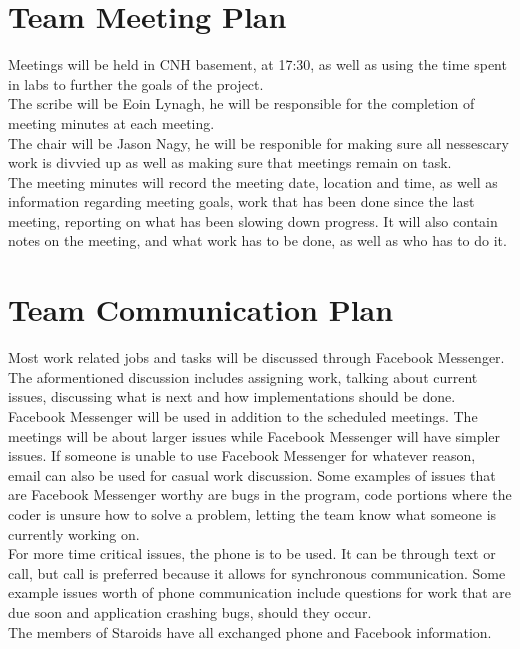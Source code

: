 \documentclass{article}
\begin{document}
\section{Team Meeting Plan}
Meetings will be held in CNH basement, at 17:30, as well as using the time spent in labs to further the goals of the project.\\
The scribe will be Eoin Lynagh, he will be responsible for the completion of meeting minutes at each meeting.\\
The chair will be Jason Nagy, he will be responible for making sure all nessescary work is divvied up as well as making sure that meetings remain on task.\\
The meeting minutes will record the meeting date, location and time, as well as information regarding meeting goals, work that has been done since the last meeting, reporting on what has been slowing down progress. It will also contain notes on the meeting, and what work has to be done, as well as who has to do it.\\

\section{Team Communication Plan}
Most work related jobs and tasks will be discussed through Facebook Messenger. The aformentioned discussion includes assigning work, talking about current issues, discussing what is next and how implementations should be done. Facebook Messenger will be used in addition to the scheduled meetings. The meetings will be about larger issues while Facebook Messenger will have simpler issues. If someone is unable to use Facebook Messenger for whatever reason, email can also be used for casual work discussion. Some examples of issues that are Facebook Messenger worthy are bugs in the program, code portions where the coder is unsure how to solve a problem, letting the team know what someone is currently working on.\\
For more time critical issues, the phone is to be used. It can be through text or call, but call is preferred because it allows for synchronous communication. Some example issues worth of phone communication include questions for work that are due soon and application crashing bugs, should they occur.\\
The members of Staroids have all exchanged phone and Facebook information.\\
\end{document}
